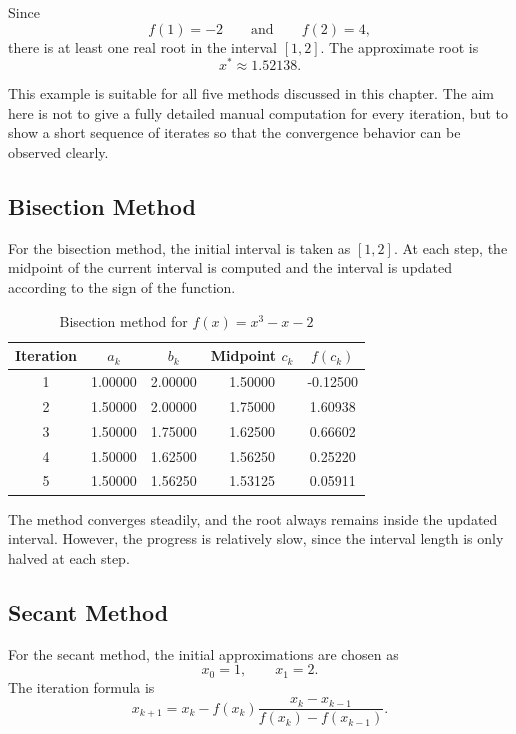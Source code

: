 Since
\[
f(1)=-2 \qquad \text{and} \qquad f(2)=4,
\]
there is at least one real root in the interval \([1,2]\). The approximate root is
\[
x^* \approx 1.52138.
\]

This example is suitable for all five methods discussed in this chapter. The aim here is not to give a fully detailed manual computation for every iteration, but to show a short sequence of iterates so that the convergence behavior can be observed clearly.

\subsection{Bisection Method}

For the bisection method, the initial interval is taken as \([1,2]\). At each step, the midpoint of the current interval is computed and the interval is updated according to the sign of the function.

\begin{table}[h!]
\centering
\caption{Bisection method for \(f(x)=x^3-x-2\)}
\label{tab:bisection_example}
\begin{tabular}{|c|c|c|c|c|}
\hline
Iteration & \(a_k\) & \(b_k\) & Midpoint \(c_k\) & \(f(c_k)\) \\ \hline
1 & 1.00000 & 2.00000 & 1.50000 & -0.12500 \\ \hline
2 & 1.50000 & 2.00000 & 1.75000 & 1.60938 \\ \hline
3 & 1.50000 & 1.75000 & 1.62500 & 0.66602 \\ \hline
4 & 1.50000 & 1.62500 & 1.56250 & 0.25220 \\ \hline
5 & 1.50000 & 1.56250 & 1.53125 & 0.05911 \\ \hline
\end{tabular}
\end{table}

The method converges steadily, and the root always remains inside the updated interval. However, the progress is relatively slow, since the interval length is only halved at each step.

\subsection{Secant Method}

For the secant method, the initial approximations are chosen as
\[
x_0=1, \qquad x_1=2.
\]
The iteration formula is
\[
x_{k+1}=x_k-f(x_k)\frac{x_k-x_{k-1}}{f(x_k)-f(x_{k-1})}.
\]

